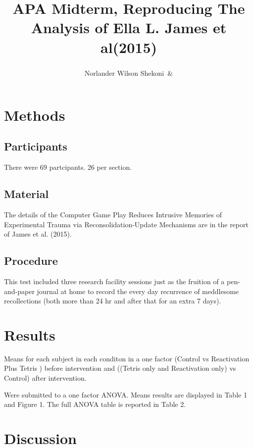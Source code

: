 \documentclass[man]{apa6}
\title{APA Midterm, Reproducing The Analysis of Ella L. James et al(2015)}
\author{Norlander Wilson Shekoni\textsuperscript{}~\&}
\date{}
\affiliation{
\vspace{0.5cm}
\textsuperscript{1} Brooklyn College City University Of New York\\\textsuperscript{} }
\begin{document}
\maketitle

\section{Methods}\label{methods}

\subsection{Participants}\label{participants}

There were 69 partcipants. 26 per section.

\subsection{Material}\label{material}

The details of the Computer Game Play Reduces Intrusive Memories of
Experimental Trauma via Reconsolidation-Update Mechanisms are in the
report of James et al. (2015).

\subsection{Procedure}\label{procedure}

This test included three research facility sessions just as the fruition
of a pen-and-paper journal at home to record the every day recurrence of
meddlesome recollections (both more than 24 hr and after that for an
extra 7 days).

\section{Results}\label{results}

Means for each subject in each conditon in a one factor (Control vs
Reactivation Plus Tetris ) before intervention and ((Tetris only and
Reactivation only) vs Control) after intervention.

Were submitted to a one factor ANOVA. Means results are displayed in
Table 1 and Figure 1. The full ANOVA table is reported in Table 2.

\section{Discussion}\label{discussion}
\end{document}
